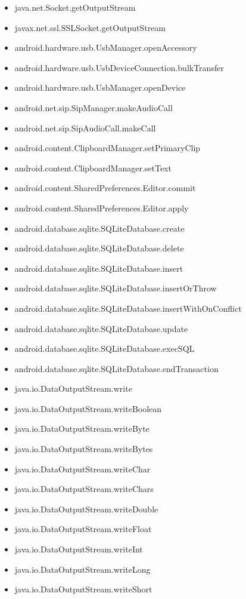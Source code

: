 \documentclass{sig-alternate}
\begin{document}
\begin{itemize}
\item java.net.Socket.getOutputStream
\item javax.net.ssl.SSLSocket.getOutputStream
\item android.hardware.usb.UsbManager.openAccessory
\item android.hardware.usb.UsbDeviceConnection.bulkTransfer
\item android.hardware.usb.UsbManager.openDevice
\item android.net.sip.SipManager.makeAudioCall
\item android.net.sip.SipAudioCall.makeCall
\item android.content.ClipboardManager.setPrimaryClip
\item android.content.ClipboardManager.setText
\item android.content.SharedPreferences.Editor.commit
\item android.content.SharedPreferences.Editor.apply
\item android.database.sqlite.SQLiteDatabase.create
\item android.database.sqlite.SQLiteDatabase.delete
\item android.database.sqlite.SQLiteDatabase.insert
\item android.database.sqlite.SQLiteDatabase.insertOrThrow
\item android.database.sqlite.SQLiteDatabase.insertWithOnConflict
\item android.database.sqlite.SQLiteDatabase.update
\item android.database.sqlite.SQLiteDatabase.execSQL
\item android.database.sqlite.SQLiteDatabase.endTransaction
\item java.io.DataOutputStream.write
\item java.io.DataOutputStream.writeBoolean
\item java.io.DataOutputStream.writeByte
\item java.io.DataOutputStream.writeBytes
\item java.io.DataOutputStream.writeChar
\item java.io.DataOutputStream.writeChars
\item java.io.DataOutputStream.writeDouble
\item java.io.DataOutputStream.writeFloat
\item java.io.DataOutputStream.writeInt
\item java.io.DataOutputStream.writeLong
\item java.io.DataOutputStream.writeShort

\end{itemize}
\end{document}

